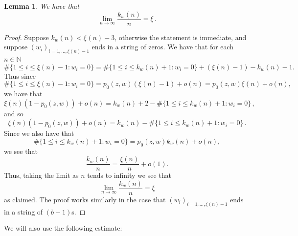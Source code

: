 \documentclass[12pt]{article}
\newtheorem{lemma}[definition]{Lemma}
\theoremstyle{remark}
\numberwithin{equation}{section}
\renewcommand{\Bbb}[1]{\mathbb{#1}}
\newcommand{\N}{{\Bbb N}}         %
\newcommand{\0}{\mathbf{0}}
\begin{document}
\begin{lemma} \label{freq}
We have that 
\begin{equation*}
    \lim_{n\to\infty}\frac{k_{w}(n)}{n}=\xi\, .
\end{equation*}
\end{lemma}
\begin{proof}
Suppose $k_{w}(n)<\xi(n)-3$, otherwise the statement is immediate, and suppose $(w_{i})_{i=1,\ldots, \xi(n)-1}$ ends in a string of zeros. We have that for each $n\in\N$
\begin{equation}\label{case0}
\#\{1\leq i\leq\xi(n)-1:w_i=0\}=\#\{1\leq i\leq k_{w}(n)+1:w_i=0\}+(\xi(n)-1)-k_{w}(n)-1.
\end{equation}
Thus since
$$\#\{1\leq i\leq\xi(n)-1:w_i=0\}=p_0(z,w)(\xi(n)-1)+\mathit{o}(n)= p_0(z,w)\xi(n)+\mathit{o}(n),$$
we have that
\begin{equation*}
\xi(n)(1-p_0(z,w))+\mathit{o}(n)=k_{w}(n)+2-\#\{1\leq i\leq k_{w}(n)+1:w_i=0\}\, ,
\end{equation*}
and so
\begin{equation*}
\xi(n)(1-p_0(z,w))+\mathit{o}(n)=k_{w}(n)-\#\{1\leq i\leq k_{w}(n)+1:w_i=0\}\, .
\end{equation*}
Since we also have that
\begin{equation*}
\#\{1\leq i\leq k_{w}(n)+1:w_i=0\}=p_0(z,w)k_{w}(n)+\mathit{o}(n),
\end{equation*}
we see that 
\[\frac{k_{w}(n)}{n} = \frac{\xi(n)}{n} + o(1).\]
Thus, taking the limit as $n$ tends to infinity we see that
\[\lim_{n \to \infty}{\frac{k_w(n)}{n}} = \xi\]
as claimed. The proof works similarly in the case that $(w_{i})_{i=1,\ldots, \xi(n)-1}$ ends in a string of $(b-1)$s.
\end{proof}

We will also use the following estimate:
\end{document}
